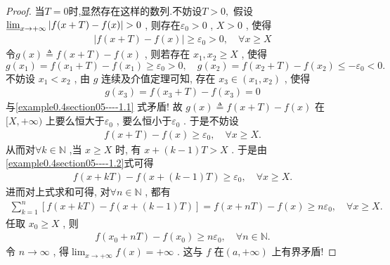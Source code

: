 \documentclass[../../main.tex]{subfiles}%
\begin{document}
\begin{proof}

当$T=0$时,显然存在这样的数列.不妨设$T>0,$
假设\(\varliminf_{x \to +\infty} \vert f(x + T) - f(x)\vert > 0\) , 则存在\(\varepsilon_0 > 0\) , \(X > 0\) , 使得
\begin{align}
\vert f(x + T) - f(x)\vert \geqslant \varepsilon_0>0,\quad \forall x \geqslant X \label{example0.4section05----1.1}
\end{align}
令\(g(x) \triangleq f(x + T) - f(x)\) , 则若存在 \(x_1, x_2 \geqslant X\) , 使得
\[g(x_1) = f(x_1 + T) - f(x_1) \geqslant \varepsilon_0 > 0 ,\quad g(x_2) = f(x_2 + T) - f(x_2) \leqslant -\varepsilon_0 < 0. \]
不妨设 \(x_1 < x_2\) , 由 \(g\) 连续及介值定理可知, 存在 \(x_3 \in (x_1, x_2)\) , 使得
\begin{align*}
g(x_3) = f(x_3 + T) - f(x_3) = 0
\end{align*}
与\eqref{example0.4section05----1.1} 式矛盾! 故 \(g(x) \triangleq f(x + T) - f(x)\) 在\([X, +\infty)\) 上要么恒大于\(\varepsilon_0\) , 要么恒小于\(\varepsilon_0\) . 于是不妨设
\begin{align}
f(x + T) - f(x) \geqslant \varepsilon_0,\quad \forall x \geqslant X .\label{example0.4section05----1.2}
\end{align}
从而对\(\forall k \in \mathbb{N}\) ,当 \(x \geqslant X\) 时, 有
\(x + (k - 1)T > X\) .
于是由\eqref{example0.4section05----1.2}式可得
\begin{align*}
f(x + kT) - f(x + (k - 1)T) \geqslant \varepsilon_0,\quad \forall x \geqslant X. 
\end{align*}
进而对上式求和可得, 对\(\forall n \in \mathbb{N}\) , 都有
\begin{align*}
\sum_{k = 1}^n [f(x + kT) - f(x + (k - 1)T)] = f(x + nT) - f(x) \geqslant n\varepsilon_0,\quad \forall x \geqslant X.
\end{align*}
任取 \(x_0 \geqslant X\) , 则
\begin{align*}
f(x_0 + nT) - f(x_0) \geqslant n\varepsilon_0,\quad \forall n \in \mathbb{N}.
\end{align*}
令 \(n \to \infty\) , 得\(\lim_{x \to +\infty} f(x) = +\infty\) . 这与 \(f\) 在\((a, +\infty)\) 上有界矛盾! 

\end{proof}
\end{document}
